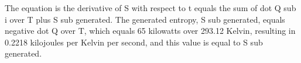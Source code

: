 The equation is the derivative of S with respect to t equals the sum of dot Q sub i over T plus S sub generated. The generated entropy, S sub generated, equals negative dot Q over T, which equals 65 kilowatts over 293.12 Kelvin, resulting in 0.2218 kilojoules per Kelvin per second, and this value is equal to S sub generated.